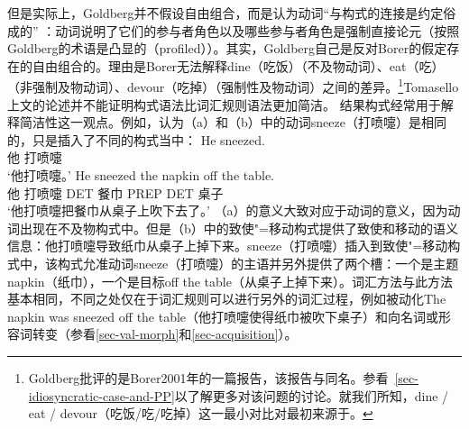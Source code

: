 \noindent
    但是实际上，Goldberg并不假设自由组合，而是认为动词“与构式的连接是约定俗成的” \citep[]{Goldberg95a}：动词说明了它们的参与者角色以及哪些参与者角色是强制直接论元（按照Goldberg的术语是凸显的（profiled））。其实，Goldberg自己\citeyearpar[]{Goldberg2006a}是反对Borer的假定存在的自由组合的\citeyearpar{Borer2003a-u}。理由是Borer无法解释dine（吃饭）（不及物动词）、eat（吃）（非强制及物动词）、devour（吃掉）（强制性及物动词）之间的差异。\footnote{Goldberg批评的是Borer2001年的一篇报告，该报告与同名。参看~\ref{sec-idiosyncratic-case-and-PP}以了解更多对该问题的讨论。就我们所知，dine / eat / devour（吃饭/吃/吃掉）这一最小对比对最初来源于\citet[--90]{Dowty89b-u}。}Tomasello上文的论述并不能证明构式语法比词汇规则语法更加简洁。
    结果构式经常用于解释简洁性这一观点。例如，\citet[\S~7]{Goldberg95a}认为（a）和（b）中的动词sneeze（打喷嚏）是相同的，只是插入了不同的构式当中：
\eal
\ex 
\gll He sneezed.\\
他 打喷嚏\\
\glt `他打喷嚏。'  
\ex 
\gll He sneezed the napkin off the table.\\
他 打喷嚏 DET 餐巾 PREP DET 桌子 \\
\glt `他打喷嚏把餐巾从桌子上吹下去了。'  
\zl
（a）的意义大致对应于动词的意义，因为动词出现在不及物构式中。但是（b）中的致使"=移动构式提供了致使和移动的语义信息：他打喷嚏导致纸巾从桌子上掉下来。sneeze（打喷嚏）插入到致使"=移动构式中，该构式允准动词sneeze（打喷嚏）的主语并另外提供了两个槽：一个是主题napkin（纸巾），一个是目标off the table（从桌子上掉下来）。词汇方法与此方法基本相同，不同之处仅在于词汇规则可以进行另外的词汇过程，例如被动化The napkin was sneezed off the table（他打喷嚏使得纸巾被吹下桌子）和向名词或形容词转变（参看\ref{sec-val-morph}和\ref{sec-acquisition}）。   
